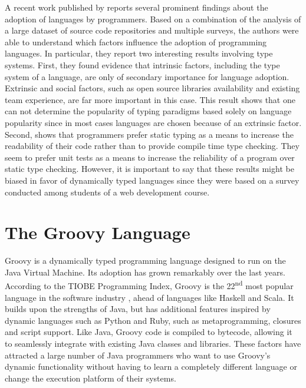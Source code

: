 \documentclass[msc]{ppgccufmg}
\begin{document}
A recent work published by \cite{Meyerovich13} reports several prominent findings about the adoption of languages by programmers.
Based on a combination of the analysis of a large dataset of source code repositories and multiple surveys, the authors were able to understand which factors influence the adoption of programming languages.
In particular, they report two interesting results involving type systems.
First, they found evidence that intrinsic factors, including the type system of a language, are only of secondary importance for language adoption.
Extrinsic and social factors, such as open source libraries availability and existing team experience, are far more important in this case.
This result shows that one can not determine the popularity of typing paradigms based solely on language popularity since in most cases languages are chosen because of an extrinsic factor.
Second, \cite{Meyerovich13} shows that programmers prefer static typing as a means to increase the readability of their code rather than to provide compile time type checking.
They seem to prefer unit tests as a means to increase the reliability of a program over static type checking.
However, it is important to say that these results might be biased in favor of dynamically typed languages since they were based on a survey conducted among students of a web development course.




\section{The Groovy Language\label{sec:groovy}}
Groovy is a dynamically typed programming language designed to run on the Java Virtual Machine.
Its adoption has grown remarkably over the last years.
According to the TIOBE Programming Index, Groovy is the 22\textsuperscript{nd} most popular language in the software industry \cite{tiobe}, ahead of languages like Haskell and Scala. 
It builds upon the strengths of Java, but has additional features inspired by dynamic languages such as Python and Ruby, such as metaprogramming, closures and script support.
Like Java, Groovy code is compiled to bytecode, allowing it to seamlessly integrate with existing Java classes and libraries. 
These factors have attracted a large number of Java programmers who want to use Groovy's dynamic functionality without having to learn a completely different language or change the execution platform of their systems. 
\end{document}
